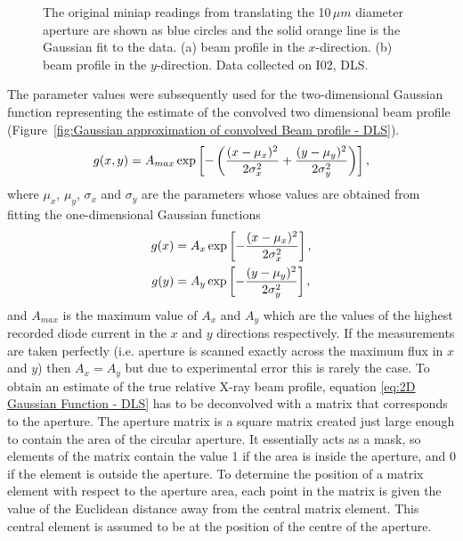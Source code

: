 \begin{figure}
\begin{subfigure}[b]{1.0\textwidth}
                \caption{}
                \label{figfity}
        \end{subfigure}
        \caption[Aperture scan measurements and the Gaussian fits to the data.]{The original miniap readings from translating the 10$\,\mu m$ diameter aperture are shown as blue circles and the solid orange line is the Gaussian fit to the data.
        (a) beam profile in the $x$-direction.
        (b) beam profile in the $y$-direction.
        Data collected on I02, DLS.}
        \label{figgfit}
\end{figure}
The parameter values were subsequently used for the two-dimensional Gaussian function representing the estimate of the convolved two dimensional beam profile (Figure~\ref{fig:Gaussian approximation of convolved Beam profile - DLS}).
\begin{equation}
g(x,y) = A_{max}\exp\left[-\left(\frac{(x - \mu_x)^2}{2\sigma_x^2} + \frac{(y - \mu_y)^2}{2\sigma_y^2}\right)\right],
\label{eq:2D Gaussian Function - DLS}
\end{equation}
where $\mu_x$, $\mu_y$, $\sigma_x$ and $\sigma_y$ are the parameters whose values are obtained from fitting the one-dimensional Gaussian functions
\begin{align}
g(x) &= A_{x}\exp\left[-\frac{(x - \mu_x)^2}{2\sigma_x^2}\right], \label{eq:1D Guassian Function x} \\
g(y) &= A_{y}\exp\left[-\frac{(y - \mu_y)^2}{2\sigma_y^2}\right], \label{eq:1D Guassian Function y}
\end{align}
and $A_{max}$ is the maximum value of $A_{x}$ and $A_{y}$ which are the values of the highest recorded diode current in the $x$ and $y$ directions respectively.
If the measurements are taken perfectly (i.e. aperture is scanned exactly across the maximum flux in $x$ and $y$) then $A_{x} = A_{y}$ but due to experimental error this is rarely the case.
\newline
To obtain an estimate of the true relative X-ray beam profile, equation \ref{eq:2D Gaussian Function - DLS} has to be deconvolved with a matrix that corresponds to the aperture.
The aperture matrix is a square matrix created just large enough to contain the area of the circular aperture.
It essentially acts as a mask, so elements of the matrix contain the value 1 if the area is inside the aperture, and 0 if the element is outside the aperture.
To determine the position of a matrix element with respect to the aperture area, each point in the matrix is given the value of the Euclidean distance away from the central matrix element.
This central element is assumed to be at the position of the centre of the aperture.
